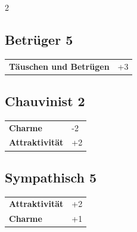 \begin{multicols}{2}
\begin{tcolorbox}
\end{tcolorbox}

\begin{tcolorbox}
    \subsection*{Betrüger \hfill \small{5 }}
    \tcblower




\begin{tabular}{@{}ll@{}}
    \textbf{Täuschen und Betrügen} & +3\\
\end{tabular}


\end{tcolorbox}

\begin{tcolorbox}
    \subsection*{Chauvinist \hfill \small{2 }}
    \tcblower




\begin{tabular}{@{}ll@{}}
    \textbf{Charme} & -2\\
    \textbf{Attraktivität} & +2\\
\end{tabular}


\end{tcolorbox}

\begin{tcolorbox}
    \subsection*{Sympathisch \hfill \small{5 }}
    \tcblower




\begin{tabular}{@{}ll@{}}
    \textbf{Attraktivität} & +2\\
    \textbf{Charme} & +1\\
\end{tabular}


\end{tcolorbox}
\end{multicols}
